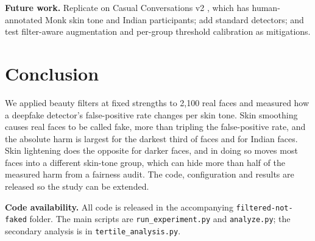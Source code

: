 \documentclass[11pt]{article}
\begin{document}
\textbf{Future work.} Replicate on Casual Conversations v2 \cite{ccv2}, which has human-annotated Monk skin tone and Indian participants; add standard detectors; and test filter-aware augmentation and per-group threshold calibration as mitigations.

\section{Conclusion}
We applied beauty filters at fixed strengths to 2,100 real faces and measured how a deepfake detector's false-positive rate changes per skin tone. Skin smoothing causes real faces to be called fake, more than tripling the false-positive rate, and the absolute harm is largest for the darkest third of faces and for Indian faces. Skin lightening does the opposite for darker faces, and in doing so moves most faces into a different skin-tone group, which can hide more than half of the measured harm from a fairness audit. The code, configuration and results are released so the study can be extended.

{\sloppy\textbf{Code availability.} All code is released in the accompanying \texttt{filtered-not-faked} folder. The main scripts are \texttt{run\_experiment.py} and \texttt{analyze.py}; the secondary analysis is in \texttt{tertile\_analysis.py}.\par}
\end{document}

